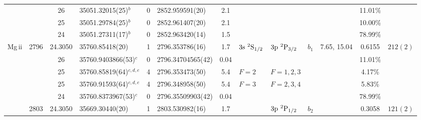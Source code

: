 \begin{table*}
\begin{center}
{\begin{tabular}{:l;l;c;l;c;l;c;l;l;c;c;c;c}
\rowstyle{\itshape}               &        & 26        & 35051.32015(25)$^{b}$            & 0 &   2852.959591(20)  &  2.1 & $                                        $ & $                                        $ & $      $ &              & 11.01\%   & $          $\\
\rowstyle{\itshape}               &        & 25        & 35051.29784(25)$^{b}$            & 0 &   2852.961407(20)  &  2.1 & $                                        $ & $                                        $ & $      $ &              & 10.00\%   & $          $\\
\rowstyle{\itshape}               &        & 24        & 35051.27311(17)$^{b}$            & 0 &   2852.963420(14)  &  1.5 & $                                        $ & $                                        $ & $      $ &              & 78.99\%   & $          $\\
                    Mg{\sc \,ii}  & 2796   & 24.3050   & 35760.85418(20)$^{}$             & 1 &   2796.353786(16)  &  1.7 & $3\rm{s}~^2\rm{S}_{1/2}                  $ & $3\rm{p}~^2\rm{P}_{3/2}                  $ & $b_{1} $ & 7.65, 15.04  & 0.6155    & $  212(2)  $\\
\rowstyle{\itshape}               &        & 26        & 35760.9403866(53)$^{c}$          & 0 & 2796.34704565(42)  & 0.04 & $                                        $ & $                                        $ & $      $ &              & 11.01\%   & $          $\\
\rowstyle{\itshape}               &        & 25        & 35760.85819(64)$^{c,d,e}$        & 4 &   2796.353473(50)  &  5.4 & $F=2                                     $ & $F=1,2,3                                 $ & $      $ &              & 4.17\%    & $          $\\
\rowstyle{\itshape}               &        & 25        & 35760.91593(64)$^{c,d,e}$        & 4 &   2796.348958(50)  &  5.4 & $F=3                                     $ & $F=2,3,4                                 $ & $      $ &              & 5.83\%    & $          $\\
\rowstyle{\itshape}               &        & 24        & 35760.8373967(53)$^{c}$          & 0 & 2796.35509903(42)  & 0.04 & $                                        $ & $                                        $ & $      $ &              & 78.99\%   & $          $\\
                                  & 2803   & 24.3050   & 35669.30440(20)$^{}$             & 1 &   2803.530982(16)  &  1.7 & $                                        $ & $3\rm{p}~^2\rm{P}_{1/2}                  $ & $b_{2} $ &              & 0.3058    & $  121(2)  $\\

\end{tabular}}
\end{center}
\end{table*}

